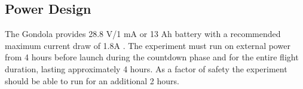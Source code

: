 \pagebreak
\subsection{Power Design}

\begin{centering}
The Gondola provides 28.8 V/1 mA or 13 Ah battery with a recommended maximum current draw of 1.8A \cite{BexusManual}. The experiment must run on external power from 4 hours before launch during the countdown phase and for the entire flight duration, lasting approximately 4 hours. As a factor of safety the experiment should be able to run for an additional 2 hours. 
\end{centering}




\raggedbottom
